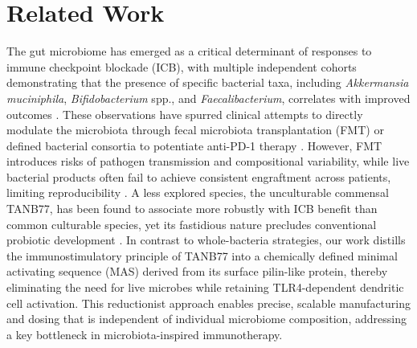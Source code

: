 \documentclass{article}
\begin{document}
\section{Related Work}

The gut microbiome has emerged as a critical determinant of responses to immune checkpoint blockade (ICB), with multiple independent cohorts demonstrating that the presence of specific bacterial taxa, including \textit{Akkermansia muciniphila}, \textit{Bifidobacterium} spp., and \textit{Faecalibacterium}, correlates with improved outcomes \cite{routy2018gut,gopalakrishnan2018gut,matson2018commensal}. These observations have spurred clinical attempts to directly modulate the microbiota through fecal microbiota transplantation (FMT) or defined bacterial consortia to potentiate anti-PD-1 therapy \cite{baruch2021fmt,davar2021fmt}. However, FMT introduces risks of pathogen transmission and compositional variability, while live bacterial products often fail to achieve consistent engraftment across patients, limiting reproducibility \cite{zitvogel2020microbiome}. A less explored species, the unculturable commensal TANB77, has been found to associate more robustly with ICB benefit than common culturable species, yet its fastidious nature precludes conventional probiotic development \cite{tanb77_icb2022}. In contrast to whole-bacteria strategies, our work distills the immunostimulatory principle of TANB77 into a chemically defined minimal activating sequence (MAS) derived from its surface pilin-like protein, thereby eliminating the need for live microbes while retaining TLR4-dependent dendritic cell activation. This reductionist approach enables precise, scalable manufacturing and dosing that is independent of individual microbiome composition, addressing a key bottleneck in microbiota-inspired immunotherapy.
\end{document}
